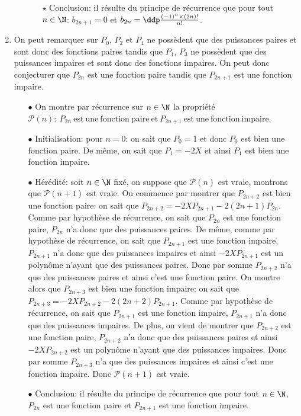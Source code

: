 \documentclass[a4paper, 11pt,reqno]{article}
\begin{document}
\begin{correction}
\begin{enumerate}
\begin{itemize}
\begin{itemize}
				            \item[$\star$] Conclusion: il r\'esulte du principe de r\'ecurrence que pour tout $n\in\N$: $b_{2n+1}=0$ et $b_{2n}=\ddp\frac{(-1)^n\times (2n)!}{n!}$.
			            \end{itemize}
		      \end{itemize}
		\item On peut remarquer sur $P_0$, $P_2$ et $P_4$ ne poss\`{e}dent que des puissances paires et sont donc des fonctions paires tandis que $P_1$, $P_3$ ne poss\`{e}dent que des puissances impaires et sont donc des fonctions impaires. On peut donc conjecturer que $P_{2n}$ est une fonction paire tandis que $P_{2n+1}$ est une fonction impaire.
		      \begin{itemize}
			      \item[$\bullet$] On montre par r\'ecurrence sur $n\in\N$ la propri\'et\'e $\mathcal{P}(n):\ P_{2n}\ \mathrm{est\ une\ fonction\ paire\ et}\ P_{2n+1}\ \mathrm{est\ une\ fonction\ impaire}$.
			      \item[$\bullet$] Initialisation: pour $n=0$: on sait que $P_0=1$ et donc $P_0$ est bien une fonction paire. De m\^{e}me, on sait que $P_1=-2X$ et ainsi $P_1$ est bien une fonction impaire.
			      \item[$\bullet$] H\'er\'edit\'e: soit $n\in\N$ fix\'e, on suppose que $\mathcal{P}(n)$ est vraie, montrons que $\mathcal{P}(n+1)$ est vraie. On commence par montrer que $P_{2n+2}$ est bien une fonction paire: on sait que $P_{2n+2}=-2XP_{2n+1}-2(2n+1)P_{2n}$. Comme par hypoth\`{e}se de r\'ecurrence, on sait que $P_{2n}$ est une fonction paire, $P_{2n}$ n'a donc que des puissances paires. De m\^{e}me, comme par hypoth\`{e}se de r\'ecurrence, on sait que $P_{2n+1}$ est une fonction impaire, $P_{2n+1}$ n'a donc que des puissances impaires et ainsi $-2XP_{2n+1}$ est un polyn\^{o}me n'ayant que des puissances paires. Donc par somme $P_{2n+2}$ n'a que des puissances paires et ainsi c'est une fonction paire. On montre alors que $P_{2n+3}$ est bien une fonction impaire: on sait que $P_{2n+3}=-2XP_{2n+2}-2(2n+2)P_{2n+1}$. Comme par hypoth\`{e}se de r\'ecurrence, on sait que $P_{2n+1}$ est une fonction impaire, $P_{2n+1}$ n'a donc que des puissances impaires. De plus, on vient de montrer que $P_{2n+2}$ est une fonction paire, $P_{2n+2}$ n'a donc que des puissances paires et ainsi $-2XP_{2n+2}$ est un polyn\^{o}me n'ayant que des puissances impaires. Donc par somme $P_{2n+3}$ n'a que des puissances impaires et ainsi c'est une fonction impaire. Donc $\mathcal{P}(n+1)$ est vraie.
			      \item[$\bullet$] Conclusion: il r\'esulte du principe de r\'ecurrence que pour tout $n\in\N$, $P_{2n}$ est une fonction paire et $P_{2n+1}$ est une fonction impaire.
		      \end{itemize}
	\end{enumerate}
\end{correction}
\end{document}
